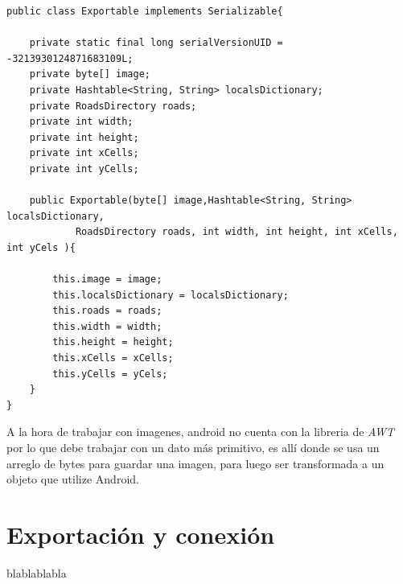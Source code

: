 \documentclass[11pt]{book}
\begin{document}
\begin{lstlisting}
public class Exportable implements Serializable{

	private static final long serialVersionUID = -3213930124871683109L;
	private byte[] image;
	private Hashtable<String, String> localsDictionary;
	private RoadsDirectory roads;
	private int width;
	private int height;
	private int xCells;
	private int yCells;

	public Exportable(byte[] image,Hashtable<String, String> localsDictionary,
			RoadsDirectory roads, int width, int height, int xCells, int yCels ){
		
		this.image = image;
		this.localsDictionary = localsDictionary;
		this.roads = roads;
		this.width = width;
		this.height = height;
		this.xCells = xCells;
		this.yCells = yCels;	
	}
}
\end{lstlisting}
A la hora de trabajar con imagenes, android no cuenta con la libreria de \emph{AWT}  por lo que debe trabajar con un dato más primitivo, es allí donde se usa un arreglo de bytes para guardar una imagen, para luego ser transformada a un objeto que utilize Android.
\section{Exportación y conexión}
blablablabla                 




\newpage
\printglossaries
\renewcommand*{\glossaryname}{Glosario}
\end{document}
